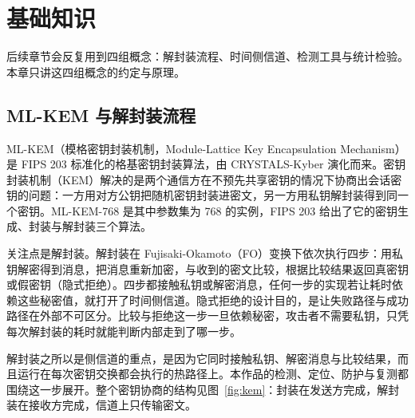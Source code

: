 
\usetikzlibrary{positioning}

\section{基础知识}

后续章节会反复用到四组概念：解封装流程、时间侧信道、检测工具与统计检验。本章只讲这四组概念的约定与原理。

\subsection{ML-KEM 与解封装流程}

ML-KEM（模格密钥封装机制，Module-Lattice Key Encapsulation Mechanism）是 FIPS 203 标准化的格基密钥封装算法，由 CRYSTALS-Kyber 演化而来。密钥封装机制（KEM）解决的是两个通信方在不预先共享密钥的情况下协商出会话密钥的问题：一方用对方公钥把随机密钥封装进密文，另一方用私钥解封装得到同一个密钥。ML-KEM-768 是其中参数集为 768 的实例，FIPS 203 给出了它的密钥生成、封装与解封装三个算法。

关注点是解封装。解封装在 Fujisaki-Okamoto（FO）变换下依次执行四步：用私钥解密得到消息，把消息重新加密，与收到的密文比较，根据比较结果返回真密钥或假密钥（隐式拒绝）。四步都接触私钥或解密消息，任何一步的实现若让耗时依赖这些秘密值，就打开了时间侧信道。隐式拒绝的设计目的，是让失败路径与成功路径在外部不可区分。比较与拒绝这一步一旦依赖秘密，攻击者不需要私钥，只凭每次解封装的耗时就能判断内部走到了哪一步。

解封装之所以是侧信道的重点，是因为它同时接触私钥、解密消息与比较结果，而且运行在每次密钥交换都会执行的热路径上。本作品的检测、定位、防护与复测都围绕这一步展开。整个密钥协商的结构见图~\ref{fig:kem}：封装在发送方完成，解封装在接收方完成，信道上只传输密文。

